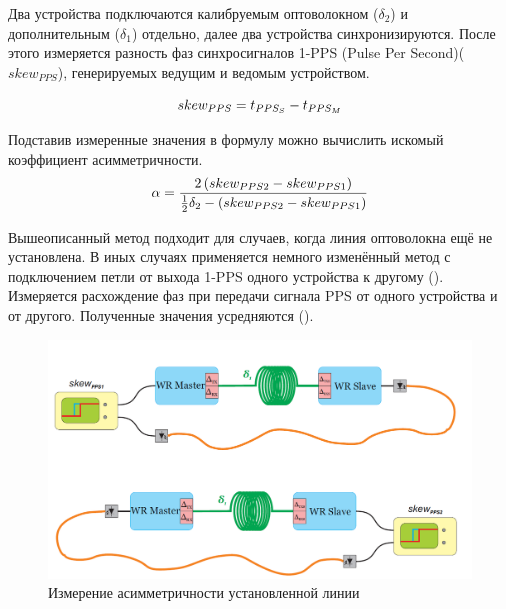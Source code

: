 Два устройства подключаются калибруемым оптоволокном ($\delta_{2}$) и дополнительным ($\delta_{1}$) отдельно, 
далее два устройства синхронизируются. После этого измеряется разность фаз синхросигналов 1-PPS
(Pulse Per Second)($ skew_{PPS} $), генерируемых ведущим и ведомым устройством. 

\begin{equation}
	skew_{PPS} = t_{PPS_S} - t_{PPS_M}\\
\end{equation}

Подставив измеренные значения в формулу  можно вычислить искомый коэффициент асимметричности.\\

\begin{equation}
	\label{eq:alpha}
	\alpha = \frac{2 \left( skew_{PPS2} - skew_{PPS1} \right) }{\frac{1}{2} \delta_2 - \left( skew_{PPS2} - skew_{PPS1} \right)}\\
\end{equation}

\bigbreak

Вышеописанный метод подходит для случаев, когда линия оптоволокна ещё не установлена.
В иных случаях применяется немного изменённый метод с подключением петли от выхода 1-PPS одного устройства к другому (). 
Измеряется расхождение фаз при передачи сигнала PPS от одного устройства и от другого. Полученные значения усредняются ().

\begin{figure}[ht!] 
	\center
	\includegraphics [scale=0.4] {my_folder/images//meas_scheme_2}
	\caption{Измерение асимметричности установленной линии} 
	\label{fig:meas-scheme-2}  
\end{figure}

